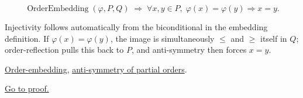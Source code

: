 \begin{remark*}
\[
\operatorname{OrderEmbedding}(\varphi, P, Q)
\;\Longrightarrow\;
\forall x, y \in P,\; \varphi(x) = \varphi(y) \Rightarrow x = y.
\]
\end{remark*}

\begin{remark*}[Interpretation]
Injectivity follows automatically from the biconditional in the embedding
definition.  If $\varphi(x) = \varphi(y)$, the image is simultaneously
$\leq$ and $\geq$ itself in $Q$; order-reflection pulls this back to $P$,
and anti-symmetry then forces $x = y$.
\end{remark*}

\begin{remark*}[Dependencies]
\hyperref[def:order-embedding]{Order-embedding},
\hyperref[def:lattice-order-partial-order]{anti-symmetry of partial orders}.
\end{remark*}

\begin{remark*}[Proof]
\hyperref[prf:order-embedding-injective]{Go to proof.}
\end{remark*}
